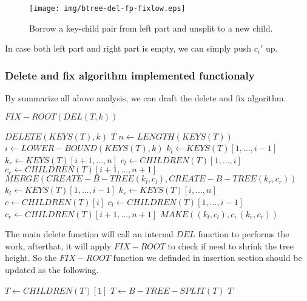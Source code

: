 \documentclass{article}
\begin{document}
\begin{figure}[htbp]
    \begin{center}
      \texttt{[image: img/btree-del-fp-fixlow.eps]}
      \caption{Borrow a key-child pair from left part and
unsplit to a new child.} \label{fig:del-fp-fixlow}
    \end{center}
\end{figure}

In case both left part and right part is empty, we can simply
push $c_i'$ up.

\subsubsection{Delete and fix algorithm implemented functionaly}

By summarize all above analysis, we can draft the delete and fix
algorithm.

\begin{algorithmic}[1]
  \State \Return $FIX-ROOT(DEL(T, k))$
\EndFunction

    \State $DELETE(KEYS(T), k)$
    \State \Return $T$
  \Else {}
    \State $n \gets LENGTH(KEYS(T))$
    \State $i \gets LOWER-BOUND(KEYS(T), k)$
      \State $k_l \gets KEYS(T)[1, ..., i-1]$
      \State $k_r \gets KEYS(T)[i+1, ..., n]$
      \State $c_l \gets CHILDREN(T)[1, ..., i]$
      \State $c_r \gets CHILDREN(T)[i+1, ..., n+1]$
      \State \Return $MERGE(CREATE-B-TREE(k_l, c_l), CREATE-B-TREE(k_r, c_r))$
    \Else
      \State $k_l \gets KEYS(T)[1, ..., i-1]$
      \State $k_r \gets KEYS(T)[i, ..., n]$
      \State $c \gets CHILDREN(T)[i]$
      \State $c_l \gets CHILDREN(T)[1, ..., i-1]$
      \State $c_r \gets CHILDREN(T)[i+1, ..., n+1]$
      \State \Return $MAKE((k_l, c_l), c, (k_r, c_r))$
    \EndIf
  \EndIf
\EndFunction
\end{algorithmic}

The main delete function will call an internal $DEL$ function to
performs the work, afterthat, it will apply $FIX-ROOT$ to check
if need to shrink the tree height. So the $FIX-ROOT$ function we
definded in insertion section should be updated as the following.

\begin{algorithmic}[1]
   
    \State $T \gets CHILDREN(T)[1]$
    \State $T \gets B-TREE-SPLIT(T)$
  \EndIf
  \State \Return $T$
\EndFunction
\end{algorithmic}
\end{document}

